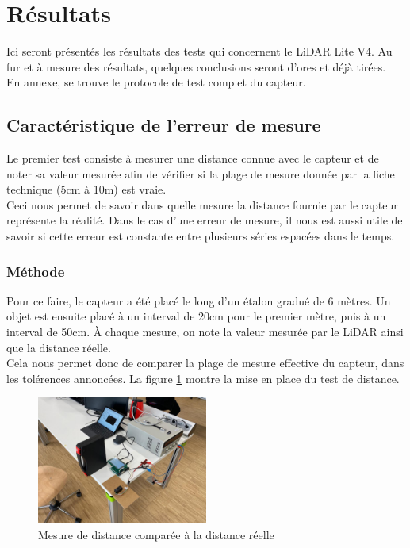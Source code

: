 \section{Résultats}

Ici seront présentés les résultats des tests qui concernent le LiDAR Lite V4. Au fur et à mesure des
résultats, quelques conclusions seront d'ores et déjà tirées.\\
En annexe, se trouve le protocole de test complet du capteur.

\subsection{Caractéristique de l'erreur de mesure}

Le premier test consiste à mesurer une distance connue avec le capteur et de noter sa valeur mesurée
afin de vérifier si la plage de mesure donnée par la fiche technique (5cm à 10m) est vraie.\\
Ceci nous permet de savoir dans quelle mesure la distance fournie par le capteur représente la réalité.
Dans le cas d'une erreur de mesure, il nous est aussi utile de savoir si cette erreur est constante 
entre plusieurs séries espacées dans le temps.

\subsubsection{Méthode}

Pour ce faire, le capteur a été placé le long d'un étalon gradué de 6 mètres. Un objet est ensuite
placé à un interval de 20cm pour le premier mètre, puis à un interval de 50cm. À chaque mesure, on 
note la valeur mesurée par le LiDAR ainsi que la distance réelle.\\
Cela nous permet donc de comparer la plage de mesure effective du capteur, dans les tolérences
annoncées. La figure \ref{RealDistanceMeasures} montre la mise en place du test de distance.

\begin{figure}[H]
    \centering
    \includegraphics[width=0.5\textwidth]{Images/LiDAR/RealDistanceMes.jpeg}
    \caption{Mesure de distance comparée à la distance réelle}
    \label{RealDistanceMeasures}
\end{figure}

